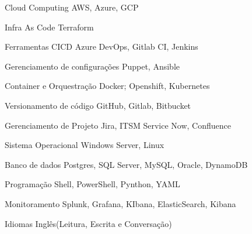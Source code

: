 

\begin{cvskills}

  \cvskill
    {Cloud Computing} %
    {AWS, Azure, GCP} %

  \cvskill
    {Infra As Code} %
    {Terraform} %

  \cvskill
    {Ferramentas CICD} %
    {Azure DevOps, Gitlab CI, Jenkins} %

  \cvskill
    {Gerenciamento de configurações} %
    {Puppet, Ansible} %

  \cvskill
    {Container e Orquestração} %
    {Docker; Openshift, Kubernetes} %

  \cvskill
    {Versionamento de código} %
    {GitHub, Gitlab, Bitbucket} %

  \cvskill
    {Gerenciamento de Projeto} %
    {Jira, ITSM Service Now, Confluence} %

  \cvskill
    {Sistema Operacional} %
    {Windows Server, Linux} %

  \cvskill
    {Banco de dados} %
    {Postgres, SQL Server, MySQL, Oracle, DynamoDB} %

  \cvskill
    {Programação} %
    {Shell, PowerShell, Pynthon, YAML} %

  \cvskill
    {Monitoramento} %
    {Splunk, Grafana, KIbana, ElasticSearch, Kibana} %

  \cvskill
    {Idiomas} %
    {Inglês(Leitura, Escrita e Conversação)} %

\end{cvskills}